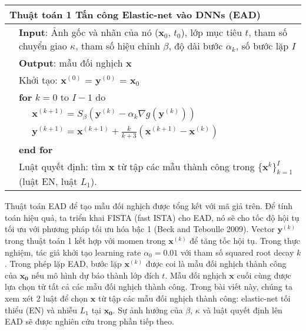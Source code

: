 \begin{center}
	\begin{tabular}{lll}
		\hline 
		\multicolumn{3}{l}{\textbf{Thuật toán 1} Tấn công Elastic-net vào DNNs (EAD)} \\
		\hline 
		& \multicolumn{2}{p{14cm}}{\textbf{Input}: Ảnh gốc và nhãn của nó ($\mathbf{x}_0$, $t_0$), lớp mục tiêu $t$, tham số chuyển giao $\kappa$, tham số hiệu chỉnh $\beta$, độ dài bước $\alpha_k$, số bước lặp $I$} \\
		& \multicolumn{2}{l}{\textbf{Output}: mẫu đối nghịch $\mathbf{x}$} \\
		& \multicolumn{2}{l}{Khởi tạo: $\mathbf{x}^{(0)}$ = $\mathbf{y}^{(0)}$ = $\mathbf{x}_0$} \\
		& \multicolumn{2}{l}{\textbf{for} $k = 0$ to $I - 1$ do} \\
		&& $\mathbf{x}^{(k+1)} = S_{\beta}(\mathbf{y}^{(k)} -\alpha_{k} \nabla g(\mathbf{y}^{(k)}))$ \\
		&& $\mathbf{y}^{(k+1)} = \mathbf{x}^{(k+1)} + \frac{k}{k+3} (\mathbf{x}^{(k+1)} - \mathbf{x}^{(k)}) $ \\
		& \multicolumn{2}{l}{\textbf{end for}} \\
		& \multicolumn{2}{p{14cm}}{Luật quyết định: tìm $\mathbf{x}$ từ tập các mẫu thành công trong $\{\mathbf{x}^k\}_{k=1}^{I}$ (luật EN, luật $L_1$).}\\
		\hline
	\end{tabular}
	\label{arg:ag_1}
\end{center}

Thuật toán EAD để tạo mẫu đối nghịch được tổng kết với mã giả trên. Để tính toán hiệu quả,
 ta triển khai FISTA (fast ISTA) cho EAD, nó sẽ cho tốc độ hội tụ tối ưu với phương pháp 
 tối ưu hóa bậc 1 (Beck and Teboulle 2009). Vector $\mathbf{y}^{(k)}$ trong thuật toán 1 
 kết hợp với momen trong $\mathbf{x}^{(k)}$ để tăng tốc hội tụ. Trong thực nghiệm, tác giả khởi tạo learning rate $\alpha_0 = 0.01$ với tham số squared root decay $k$. Trong phép lặp EAD, bước lặp $\mathbf{x}^{(k)}$ 
 được coi là mẫu đối nghịch thành công của $\mathbf{x_0}$ nếu mô hình dự báo thành lớp 
 đích $t$. Mẫu đối nghịch $\mathbf{x}$ cuối cùng được lựa chọn từ tất cả các mẫu đối nghịch 
 thành công. Trong bài viết này, chúng ta xem xét 2 luật để chọn $\mathbf{x}$ từ tập các 
 mẫu đối nghịch thành công: elastic-net tối thiểu (EN) và nhiễu $L_1$ tại $\mathbf{x_0}$.
Sự ảnh hưởng của $\beta$, $\kappa$  và luật quyết định lên EAD sẽ được nghiên cứu trong phần tiếp theo.
